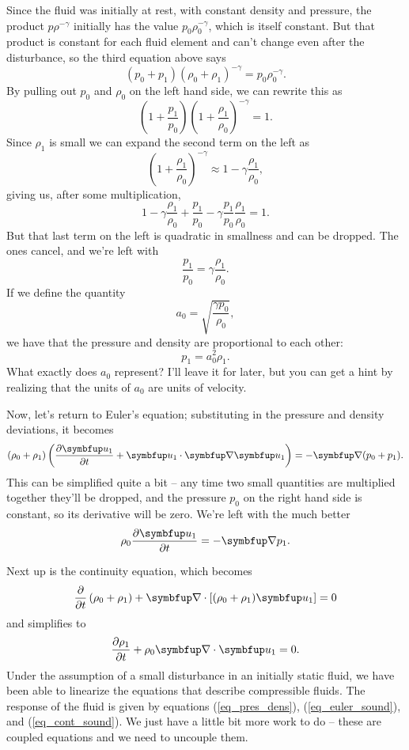 Since the fluid was initially at rest, with constant density and pressure, the product $p\rho^{-\gamma}$ initially has the value $p_0 \rho_0^{-\gamma}$, which is itself constant. But that product is constant for each fluid element and can't change even after the disturbance, so the third equation above says
\[
(p_0 + p_1) (\rho_0 + \rho_1)^{-\gamma} = p_0 \rho_0^{-\gamma}.
\]
By pulling out $p_0$ and $\rho_0$ on the left hand side, we can rewrite this as
\[
\left( 1 + \frac{p_1}{p_0} \right) \left( 1 + \frac{\rho_1}{\rho_0} \right)^{-\gamma} = 1.
\]
Since $\rho_1$ is small we can expand the second term on the left as
\[
\left( 1 + \frac{\rho_1}{\rho_0} \right)^{-\gamma} \approx 1 - \gamma \frac{\rho_1}{\rho_0},
\]
giving us, after some multiplication,
\[
1 - \gamma \frac{\rho_1}{\rho_0} + \frac{p_1}{p_0} - \gamma \frac{p_1}{p_0} \frac{\rho_1}{\rho_0} = 1.
\]
But that last term on the left is quadratic in smallness and can be dropped.  The ones cancel, and we're left with
\[
\frac{p_1}{p_0} = \gamma \frac{\rho_1}{\rho_0}.
\]
If we define the quantity
\begin{equation}
a_0 = \sqrt{\frac{\gamma p_0}{\rho_0}},
\end{equation}
we have that the pressure and density are proportional to each other:
\begin{equation}
\label{eq_pres_dens}
p_1 = a_0^2 \rho_1.
\end{equation}
What exactly does $a_0$ represent?  I'll leave it for later, but you can get a hint by realizing that the units of $a_0$ are units of velocity.

Now, let's return to Euler's equation; substituting in the pressure and density deviations, it becomes
\[
(\rho_0 + \rho_1) \left( \dfdx{\vec{u}_1}{t} + \vec{u}_1 \cdot \grad \vec{u}_1 \right) = - \grad (p_0 + p_1).
\]
This can be simplified quite a bit -- any time two small quantities are multiplied together they'll be dropped, and the pressure $p_0$ on the right hand side is constant, so its derivative will be zero.  We're left with the much better
\begin{equation}
\label{eq_euler_sound}
\rho_0 \dfdx{\vec{u}_1}{t} = -\grad p_1.
\end{equation}

Next up is the continuity equation, which becomes
\[
\frac{\partial}{\partial t} \left( \rho_0 + \rho_1 \right) + \grad \cdot \left[ (\rho_0 + \rho_1) \vec{u}_1 \right] = 0
\]
and simplifies to
\begin{equation}
\label{eq_cont_sound}
\dfdx{\rho_1}{t} + \rho_0 \grad \cdot \vec{u}_1 = 0.
\end{equation}
Under the assumption of a small disturbance in an initially static fluid, we have been able to linearize the equations that describe compressible fluids.  The response of the fluid is given by equations (\ref{eq_pres_dens}), (\ref{eq_euler_sound}), and (\ref{eq_cont_sound}).  We just have a little bit more work to do -- these are coupled equations and we need to uncouple them.

